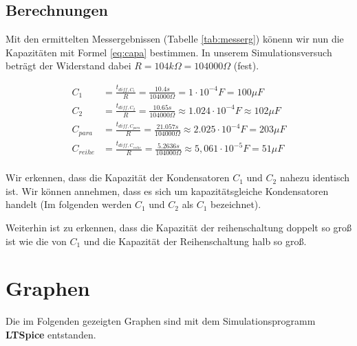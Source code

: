 \documentclass[10pt,a4paper]{article}
\begin{document}
\subsection{Berechnungen}
\begin{flushleft}
Mit den ermittelten Messergebnissen (Tabelle \ref{tab:messerg}) könenn wir nun die Kapazitäten mit Formel \ref{eq:capa} bestimmen. In unserem Simulationsversuch beträgt der Widerstand dabei $R = 104k\Omega = 104000 \Omega$ (fest).

\begin{align*}
C_1 &= \frac{t_{diff, C_1}}{R} = \frac{10.4 s}{104000 \Omega} = 1 \cdot 10^{-4} F = 100 \mu F \\
C_2 &= \frac{t_{diff, C_2}}{R} = \frac{10.65 s}{104000 \Omega} \approx 1.024 \cdot 10^{-4} F \approx 102 \mu F \\
C_{para} &= \frac{t_{diff, C_{para}}}{R} = \frac{21.057 s}{104000 \Omega} \approx 2.025 \cdot 10^{-4} F = 203 \mu F \\
C_{reihe} &= \frac{t_{diff, C_{reihe}}}{R} = \frac{5.2636 s}{104000 \Omega} \approx 5,061 \cdot 10^{-5} F = 51 \mu F \\
\end{align*}

Wir erkennen, dass die Kapazität der Kondensatoren $C_1$ und $C_2$ nahezu identisch ist. Wir können annehmen, dass es sich um kapazitätsgleiche Kondensatoren handelt (Im folgenden werden $C_1$ und $C_2$ als $C_1$ bezeichnet).

Weiterhin ist zu erkennen, dass die Kapazität der reihenschaltung doppelt so groß ist wie die von $C_1$ und die Kapazität der Reihenschaltung halb so groß.
\end{flushleft}

\section{Graphen}
\begin{flushleft}
Die im Folgenden gezeigten Graphen sind mit dem Simulationsprogramm \textbf{LTSpice} entstanden.
\end{flushleft}
\end{document}
